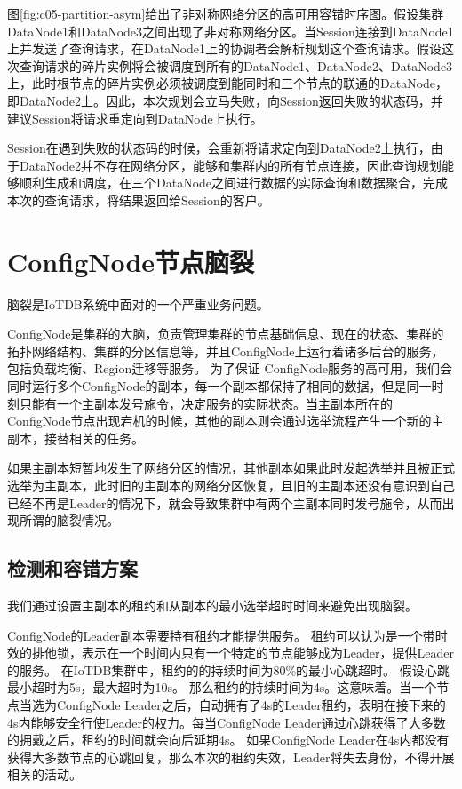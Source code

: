 图\ref{fig:c05-partition-asym}给出了非对称网络分区的高可用容错时序图。假设集群DataNode1和DataNode3之间出现了非对称网络分区。当Session连接到DataNode1上并发送了查询请求，在DataNode1上的协调者会解析规划这个查询请求。假设这次查询请求的碎片实例将会被调度到所有的DataNode1、DataNode2、DataNode3上，此时根节点的碎片实例必须被调度到能同时和三个节点的联通的DataNode，即DataNode2上。因此，本次规划会立马失败，向Session返回失败的状态码，并建议Session将请求重定向到DataNode上执行。

Session在遇到失败的状态码的时候，会重新将请求定向到DataNode2上执行，由于DataNode2并不存在网络分区，能够和集群内的所有节点连接，因此查询规划能够顺利生成和调度，在三个DataNode之间进行数据的实际查询和数据聚合，完成本次的查询请求，将结果返回给Session的客户。

\section{ConfigNode节点脑裂}

脑裂是IoTDB系统中面对的一个严重业务问题。

ConfigNode是集群的大脑，负责管理集群的节点基础信息、现在的状态、集群的拓扑网络结构、集群的分区信息等，并且ConfigNode上运行着诸多后台的服务，包括负载均衡、Region迁移等服务。
为了保证
ConfigNode服务的高可用，我们会同时运行多个ConfigNode的副本，每一个副本都保持了相同的数据，但是同一时刻只能有一个主副本发号施令，决定服务的实际状态。当主副本所在的ConfigNode节点出现宕机的时候，其他的副本则会通过选举流程产生一个新的主副本，接替相关的任务。

如果主副本短暂地发生了网络分区的情况，其他副本如果此时发起选举并且被正式选举为主副本，此时旧的主副本的网络分区恢复，且旧的主副本还没有意识到自己已经不再是Leader的情况下，就会导致集群中有两个主副本同时发号施令，从而出现所谓的脑裂情况。

\subsection{检测和容错方案}

我们通过设置主副本的租约和从副本的最小选举超时时间来避免出现脑裂。


ConfigNode的Leader副本需要持有租约才能提供服务。
租约可以认为是一个带时效的排他锁，表示在一个时间内只有一个特定的节点能够成为Leader，提供Leader的服务。
在IoTDB集群中，租约的的持续时间为80\%的最小心跳超时。
假设心跳最小超时为5s，最大超时为10s。
那么租约的持续时间为4s。这意味着。当一个节点当选为ConfigNode Leader之后，自动拥有了4s的Leader租约，表明在接下来的4s内能够安全行使Leader的权力。每当ConfigNode Leader通过心跳获得了大多数的拥戴之后，租约的时间就会向后延期4s。
如果ConfigNode Leader在4s内都没有获得大多数节点的心跳回复，那么本次的租约失效，Leader将失去身份，不得开展相关的活动。

